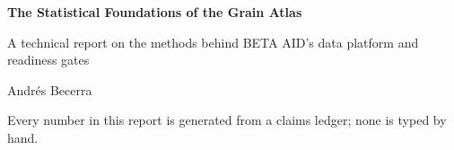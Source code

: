 \begin{titlepage}
  \centering
  \vspace*{0.2\textheight}
  {\Huge\bfseries The Statistical Foundations of the Grain Atlas\par}
  \vspace{1.5em}
  {\Large A technical report on the methods behind BETA AID's data platform and readiness gates\par}
  \vspace{3em}
  {\large Andrés Becerra\par}
  \vspace{1em}
  {\large \reportdate\par}
  \vfill
  {\small Every number in this report is generated from a claims ledger; none is typed by hand.\par}
\end{titlepage}
